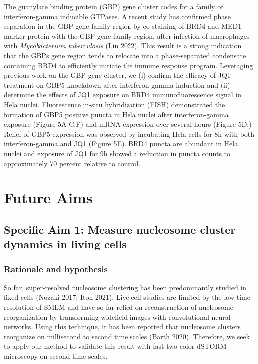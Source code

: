 \documentclass{ucetd}
\begin{document}
The guanylate binding protein (GBP) gene cluster codes for a family of interferon-gamma inducible GTPases. A recent study has confirmed phase separation in the GBP gene family region by co-staining of BRD4 and MED1 marker protein with the GBP gene family region, after infection of macrophages with \emph{Mycobacterium tuberculosis} (Lin 2022). This result is a strong indication that the GBPs gene region tends to relocate into a phase-separated condensate containing BRD4 to efficiently initiate the immune response program. Leveraging previous work on the GBP gene cluster, we (i) confirm the efficacy of JQ1 treatment on GBP5 knockdown after interferon-gamma induction and (ii) determine the effects of JQ1 exposure on BRD4 immunofluorescence signal in Hela nuclei. Fluorescence in-situ hybridization (FISH) demonstrated the formation of GBP5 positive puncta in Hela nuclei after interferon-gamma exposure (Figure 5A-C,F) and mRNA expression over several hours (Figure 5D.) Relief of GBP5 expression was observed by incubating Hela cells for 8h with both interferon-gamma and JQ1 (Figure 5E). BRD4 puncta are abundant in Hela nuclei and exposure of JQ1 for 9h showed a reduction in puncta counts to approximately 70 percent relative to control.

\section{Future Aims}

\subsection{Specific Aim 1: Measure nucleosome cluster dynamics in living cells}

\subsubsection{Rationale and hypothesis}

So far, super-resolved nucleosome clustering has been predominantly studied in fixed cells (Nozaki 2017; Itoh 2021). Live cell studies are limited by the low time resolution of SMLM and have so far relied on reconstruction of nucleosome reorganization by transforming widefield images with convolutional neural networks. Using this techinque, it has been reported that nucleosome clusters reorganize on millisecond to second time scales (Barth 2020).  Therefore, we seek to apply our method to validate this result with fast two-color dSTORM microscopy on second time scales. 
\end{document}
